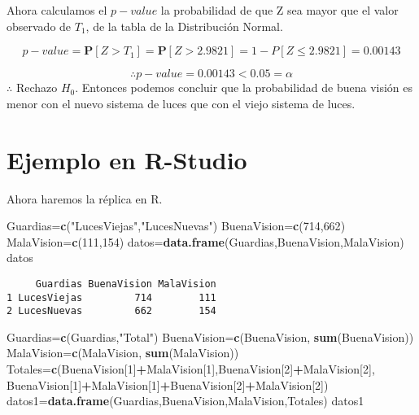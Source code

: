 \documentclass[
  a4paper,
  oneside,
  openany]{book}
\newenvironment{Shaded}{\begin{snugshade}}{\end{snugshade}}
\newcommand{\DecValTok}[1]{\textcolor[rgb]{0.00,0.00,0.81}{#1}}
\newcommand{\KeywordTok}[1]{\textcolor[rgb]{0.13,0.29,0.53}{\textbf{#1}}}
\newcommand{\NormalTok}[1]{#1}
\newcommand{\OperatorTok}[1]{\textcolor[rgb]{0.81,0.36,0.00}{\textbf{#1}}}
\newcommand{\StringTok}[1]{\textcolor[rgb]{0.31,0.60,0.02}{#1}}
\begin{document}
Ahora calculamos el \(p-value\) la probabilidad de que Z sea mayor que el valor observado de \(T_{1}\), de la tabla de la Distribución Normal.

\[p-value=\mathbf{P}[Z>T_{1}]=\mathbf{P}[Z>2.9821]=1-P[Z\leq2.9821]=0.00143\]

\[\therefore p-value=0.00143 < 0.05=\alpha\]
\(\therefore\) Rechazo \(H_0\). Entonces podemos concluir que la probabilidad de buena visión es menor con el nuevo sistema de luces que con el viejo sistema de luces.

\hypertarget{ejemplo-en-r-studio-9}{%
\section{Ejemplo en R-Studio}\label{ejemplo-en-r-studio-9}}

Ahora haremos la réplica en R.

\begin{Shaded}
\begin{Highlighting}[]
\NormalTok{Guardias=}\KeywordTok{c}\NormalTok{(}\StringTok{"LucesViejas"}\NormalTok{,}\StringTok{"LucesNuevas"}\NormalTok{)}
\NormalTok{BuenaVision=}\KeywordTok{c}\NormalTok{(}\DecValTok{714}\NormalTok{,}\DecValTok{662}\NormalTok{)}
\NormalTok{MalaVision=}\KeywordTok{c}\NormalTok{(}\DecValTok{111}\NormalTok{,}\DecValTok{154}\NormalTok{)}
\NormalTok{datos=}\KeywordTok{data.frame}\NormalTok{(Guardias,BuenaVision,MalaVision)}
\NormalTok{datos}
\end{Highlighting}
\end{Shaded}

\begin{verbatim}
     Guardias BuenaVision MalaVision
1 LucesViejas         714        111
2 LucesNuevas         662        154
\end{verbatim}

\begin{Shaded}
\begin{Highlighting}[]
\NormalTok{Guardias=}\KeywordTok{c}\NormalTok{(Guardias,}\StringTok{"Total"}\NormalTok{)}
\NormalTok{BuenaVision=}\KeywordTok{c}\NormalTok{(BuenaVision, }\KeywordTok{sum}\NormalTok{(BuenaVision))}
\NormalTok{MalaVision=}\KeywordTok{c}\NormalTok{(MalaVision, }\KeywordTok{sum}\NormalTok{(MalaVision))}
\NormalTok{Totales=}\KeywordTok{c}\NormalTok{(BuenaVision[}\DecValTok{1}\NormalTok{]}\OperatorTok{+}\NormalTok{MalaVision[}\DecValTok{1}\NormalTok{],BuenaVision[}\DecValTok{2}\NormalTok{]}\OperatorTok{+}\NormalTok{MalaVision[}\DecValTok{2}\NormalTok{],}
\NormalTok{           BuenaVision[}\DecValTok{1}\NormalTok{]}\OperatorTok{+}\NormalTok{MalaVision[}\DecValTok{1}\NormalTok{]}\OperatorTok{+}\NormalTok{BuenaVision[}\DecValTok{2}\NormalTok{]}\OperatorTok{+}\NormalTok{MalaVision[}\DecValTok{2}\NormalTok{])}
\NormalTok{datos1=}\KeywordTok{data.frame}\NormalTok{(Guardias,BuenaVision,MalaVision,Totales)}
\NormalTok{datos1}
\end{Highlighting}
\end{Shaded}
\end{document}
